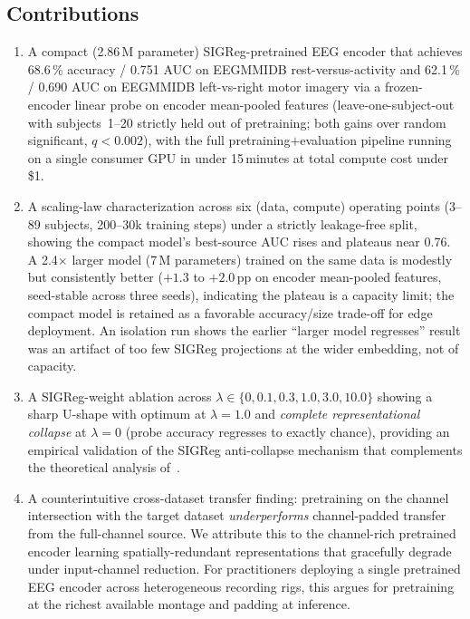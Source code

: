\subsection*{Contributions}

\begin{enumerate}
\item A compact (2.86\,M parameter) SIGReg-pretrained EEG encoder that
achieves 68.6\,\% accuracy / 0.751 AUC on EEGMMIDB rest-versus-activity
and 62.1\,\% / 0.690 AUC on EEGMMIDB left-vs-right motor imagery via a
frozen-encoder linear probe on encoder mean-pooled features
(leave-one-subject-out with subjects~1--20 strictly held out of
pretraining; both gains over random significant, $q<0.002$), with the
full pretraining$+$evaluation pipeline running on a single consumer GPU in
under 15\,minutes at total compute cost under \$1.

\item A scaling-law characterization across six (data, compute) operating
points (3--89 subjects, 200--30k training steps) under a strictly
leakage-free split, showing the compact model's best-source AUC rises and
plateaus near 0.76. A 2.4$\times$ larger model (7\,M parameters) trained on
the same data is modestly but consistently better ($+1.3$ to $+2.0$\,pp on
encoder mean-pooled features, seed-stable across three seeds), indicating the
plateau is a capacity limit; the compact model is retained as a favorable
accuracy/size trade-off for edge deployment. An isolation run shows the
earlier ``larger model regresses'' result was an artifact of too few SIGReg
projections at the wider embedding, not of capacity.

\item A SIGReg-weight ablation across $\lambda \in \{0, 0.1, 0.3, 1.0,
3.0, 10.0\}$ showing a sharp U-shape with optimum at $\lambda=1.0$ and
\emph{complete representational collapse} at $\lambda=0$ (probe accuracy
regresses to exactly chance), providing an empirical validation of the
SIGReg anti-collapse mechanism that complements the theoretical analysis
of~\cite{lejepa2025}.

\item A counterintuitive cross-dataset transfer finding: pretraining on
the channel intersection with the target dataset
\emph{underperforms} channel-padded transfer from the full-channel
source. We attribute this to the channel-rich pretrained encoder learning
spatially-redundant representations that gracefully degrade under
input-channel reduction. For practitioners deploying a single pretrained
EEG encoder across heterogeneous recording rigs, this argues for
pretraining at the richest available montage and padding at inference.


\end{enumerate}
